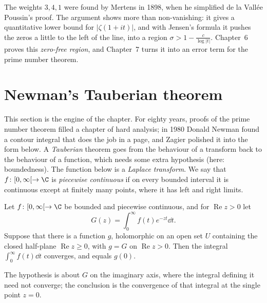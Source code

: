 \begin{remark}
The weights $3,4,1$ were found by Mertens in 1898, when he simplified de la Vallée Poussin's proof. The argument shows more than non-vanishing: it gives a quantitative
lower bound for $|\zeta(1+it)|$, and with Jensen's formula it pushes the zeros a little to the left of the line, into a region $\sigma>1-\frac c{\log|t|}$. Chapter~6 proves this
\emph{zero-free region}, and Chapter~7 turns it into an error term for the prime number theorem.
\end{remark}

\section{Newman's Tauberian theorem}

This section is the engine of the chapter. For eighty years, proofs of the prime number theorem filled a chapter of hard analysis; in 1980 Donald Newman
found a contour integral that does the job in a page, and Zagier polished it into the form below. A \emph{Tauberian} theorem goes from the behaviour of a transform back to the behaviour of a function, which needs some extra hypothesis (here: boundedness).
The function below is a \emph{Laplace transform}. We say that $f\colon[0,\infty[\to\C$ is \emph{piecewise continuous} if on every bounded interval it is continuous except at finitely
many points, where it has left and right limits.

\begin{theorem}[Newman, 1980]\label{thm:newman}
Let $f\colon[0,\infty[\to\C$ be bounded and piecewise continuous, and for $\operatorname{Re}z>0$ let
\[
G(z)=\int_0^\infty f(t)e^{-zt}\dd t.
\]
Suppose that there is a function $g$, holomorphic on an open set $U$ containing the closed half-plane $\operatorname{Re}z\ge0$, with $g=G$ on $\operatorname{Re}z>0$. Then the integral
$\int_0^\infty f(t)\dd t$ converges, and equals $g(0)$.
\end{theorem}

The hypothesis is about $G$ on the imaginary axis, where the integral defining it need not converge; the conclusion is the convergence of that integral at the single point $z=0$.

